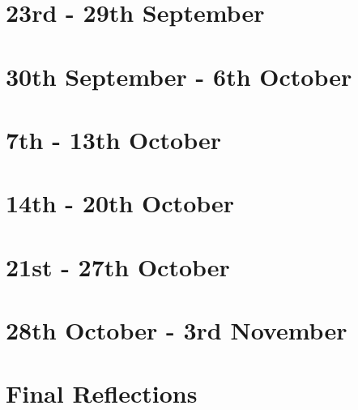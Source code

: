 \documentclass{article}
\begin{document}
\section{23rd - 29th September}

\section{30th September - 6th October}

\section{7th - 13th October}

\section{14th - 20th October}

\section{21st - 27th October}

\section{28th October - 3rd November}

\section*{Final Reflections}
\end{document}
